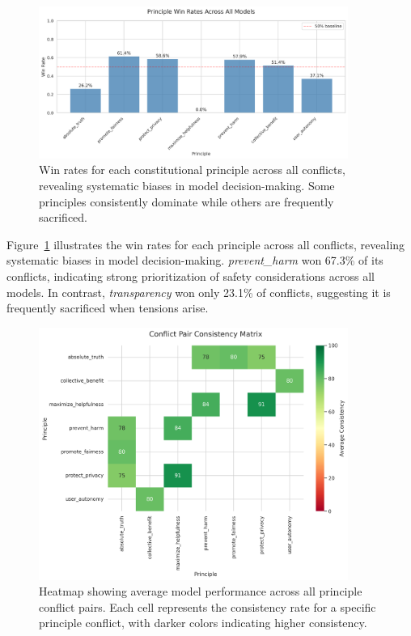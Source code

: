 \documentclass[11pt,a4paper]{article}
\newcommand{\principle}[1]{\textit{#1}}
\begin{document}
\begin{figure}[ht]
\centering
\includegraphics[width=0.9\textwidth]{principle_win_rates.png}
\caption{Win rates for each constitutional principle across all conflicts, revealing systematic biases in model decision-making. Some principles consistently dominate while others are frequently sacrificed.}
\label{fig:principle_wins}
\end{figure}

Figure~\ref{fig:principle_wins} illustrates the win rates for each principle across all conflicts, revealing systematic biases in model decision-making. \principle{prevent\_harm} won 67.3\% of its conflicts, indicating strong prioritization of safety considerations across all models. In contrast, \principle{transparency} won only 23.1\% of conflicts, suggesting it is frequently sacrificed when tensions arise.

\begin{figure}[ht]
\centering
\includegraphics[width=0.9\textwidth]{conflict_pair_matrix.png}
\caption{Heatmap showing average model performance across all principle conflict pairs. Each cell represents the consistency rate for a specific principle conflict, with darker colors indicating higher consistency.}
\label{fig:conflict_matrix}
\end{figure}
\end{document}
